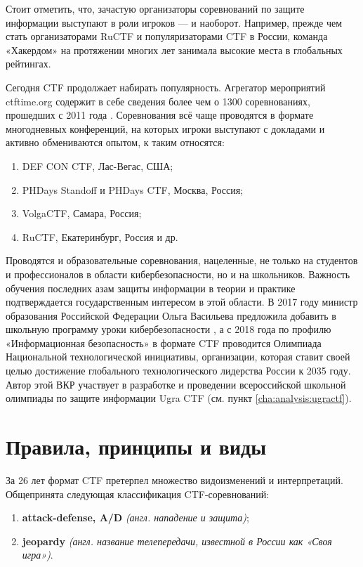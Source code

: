 Стоит отметить, что, зачастую организаторы соревнований по защите информации выступают в роли игроков --- и наоборот. Например, прежде чем стать организаторами RuCTF и популяризаторами CTF в России, команда «Хакердом» на протяжении многих лет занимала высокие места в глобальных рейтингах\cite{HackerdomRating}.

Сегодня CTF продолжает набирать популярность. Агрегатор мероприятий ctftime.org содержит в себе сведения более чем о 1300 соревнованиях, прошедших с 2011 года \cite{CTFTimeTotal}. Соревнования всё чаще проводятся в формате многодневных конференций, на которых игроки выступают с докладами и активно обмениваются опытом, к таким относятся:
\begin{enumerate}
  \item DEF CON CTF, Лас-Вегас, США;
  \item PHDays Standoff и PHDays CTF, Москва, Россия;
  \item VolgaCTF, Самара, Россия;
  \item RuCTF, Екатеринбург, Россия и др.
\end{enumerate}

Проводятся и образовательные соревнования, нацеленные, не только на студентов и профессионалов в области кибербезопасности, но и на школьников. Важность обучения последних азам защиты информации в теории и практике подтверждается государственным интересом в этой области. В 2017 году министр образования Российской Федерации Ольга Васильева предложила добавить в школьную программу уроки кибербезопасности \cite{RG17}, а с 2018 года по профилю «Информационная безопасность» в формате CTF проводится Олимпиада Национальной технологической инициативы, организации, которая ставит своей целью достижение глобального технологического лидерства России к 2035 году. Автор этой ВКР участвует в разработке и проведении всероссийской школьной олимпиады по защите информации Ugra CTF (см. пункт \ref{cha:analysis:ugractf}).



\section{Правила, принципы и виды}

За 26 лет формат CTF претерпел множество видоизменений и интерпретаций. Общепринята следующая классификация CTF-соревнований:

\begin{enumerate}
  \item \textbf{attack-defense, A/D} \textit{(англ. нападение и защита)};
  \item \textbf{jeopardy} \textit{(англ. название телепередачи, известной в России как «Своя игра»)}.
\end{enumerate}

